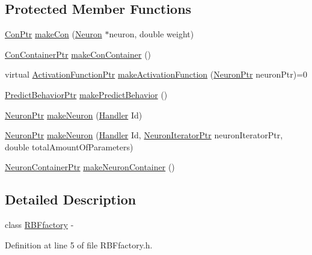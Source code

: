 \subsection*{Protected Member Functions}
\begin{DoxyCompactItemize}
\item 
\hyperlink{_a_m_o_r_e_8h_a169bb8e5f26ce70bf2b10dec2fb5ee50}{ConPtr} \hyperlink{class_r_b_ffactory_a5068c3caacf0525f7069dbec4bf87a67}{makeCon} (\hyperlink{class_neuron}{Neuron} $\ast$neuron, double weight)
\item 
\hyperlink{_a_m_o_r_e_8h_a1021dbaf961d1c8da6d58a8566e5778b}{ConContainerPtr} \hyperlink{class_r_b_ffactory_a0b85ec075904a9d915d1a3527f5d6471}{makeConContainer} ()
\item 
virtual \hyperlink{_a_m_o_r_e_8h_a77602a0277a02e5769c3df0adc669b17}{ActivationFunctionPtr} \hyperlink{class_r_b_ffactory_a5620811041643684e164fb19bd03258b}{makeActivationFunction} (\hyperlink{_a_m_o_r_e_8h_ac1ea936c2c7728eb382278131652fef4}{NeuronPtr} neuronPtr)=0
\item 
\hyperlink{_a_m_o_r_e_8h_a1fb2f1f8fdf1e08c42ef4bdce436af93}{PredictBehaviorPtr} \hyperlink{class_r_b_ffactory_a37c1e41af6f362767be462afcd417726}{makePredictBehavior} ()
\item 
\hyperlink{_a_m_o_r_e_8h_ac1ea936c2c7728eb382278131652fef4}{NeuronPtr} \hyperlink{class_r_b_ffactory_a3c6fa334aaffe3ebcbd35da57e6ce045}{makeNeuron} (\hyperlink{_a_m_o_r_e_8h_abc871abb71cff6655b8172ee7240b8ef}{Handler} Id)
\item 
\hyperlink{_a_m_o_r_e_8h_ac1ea936c2c7728eb382278131652fef4}{NeuronPtr} \hyperlink{class_r_b_ffactory_a244d2f6eb8d7d36b1fc5252ab10797ed}{makeNeuron} (\hyperlink{_a_m_o_r_e_8h_abc871abb71cff6655b8172ee7240b8ef}{Handler} Id, \hyperlink{_a_m_o_r_e_8h_aa794539c0a68e4eb451e7a2cc6294acc}{NeuronIteratorPtr} neuronIteratorPtr, double totalAmountOfParameters)
\item 
\hyperlink{_a_m_o_r_e_8h_a6157c259718f98f808c85d7f77048970}{NeuronContainerPtr} \hyperlink{class_r_b_ffactory_a9e304b053b54ad69c5b932cb0f30081c}{makeNeuronContainer} ()
\end{DoxyCompactItemize}


\subsection{Detailed Description}
class \hyperlink{class_r_b_ffactory}{RBFfactory} -\/ 

Definition at line 5 of file RBFfactory.h.



